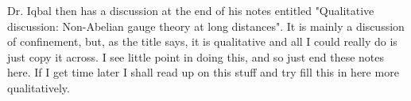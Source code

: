 \br 
    Dr. Iqbal then has a discussion at the end of his notes entitled "Qualitative discussion: Non-Abelian gauge theory at long distances". It is mainly a discussion of confinement, but, as the title says, it is qualitative and all I could really do is just copy it across. I see little point in doing this, and so just end these notes here. If I get time later I shall read up on this stuff and try fill this in here more qualitatively. 
\er 